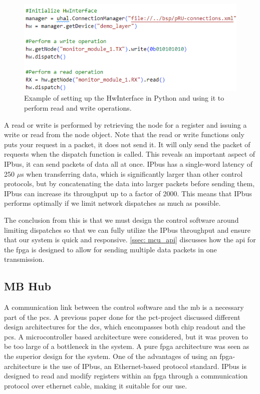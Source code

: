 \documentclass[main.tex]{subfiles}
\begin{document}
\begin{figure}[!htpb]
    \centering
    \includegraphics[scale=0.8]{images/HwInterface_example.png}
    \caption{Example of setting up the HwInterface in Python and using it to perform read and write operations.}
    \label{fig: hw_example}
\end{figure}
\FloatBarrier

A read or write is performed by retrieving the node for a register and issuing a write or read from the node object. Note that the read or write functions only puts your request in a packet, it does not send it. It will only send the packet of requests when the dispatch function is called. This reveals an important aspect of IPbus, it can send packets of data all at once. IPbus has a single-word latency of 250 $\mu$s when transferring data, which is significantly larger than other control protocols, but by concatenating the data into larger packets before sending them, IPbus can increase its throughput up to a factor of 2000\cite{IPbus}. This means that IPbus performs optimally if we limit network dispatches as much as possible.

The conclusion from this is that we must design the control software around limiting dispatches so that we can fully utilize the IPbus throughput and ensure that our system is quick and responsive. \autoref{ssec: mcu_api} discusses how the \gls{api} for the \gls{fpga} is designed to allow for sending multiple data packets in one transmission.


\subsection{MB Hub}
\label{section: fpga_design}
A communication link between the control software and the \gls{mb} is a necessary part of the \gls{pcs}. A previous paper done for the \gls{pct}-project discussed different design architectures for the \gls{dcs}, which encompasses both chip readout and the \gls{pcs}\cite{ola}. A microcontroller based architecture were considered, but it was proven to be too large of a bottleneck in the system. A pure \gls{fpga} architecture was seen as the superior design for the system. One of the advantages of using an \gls{fpga}-architecture is the use of IPbus, an Ethernet-based protocol standard. IPbus is designed to read and modify registers within an \gls{fpga} through a communication protocol over ethernet cable, making it suitable for our use.
\end{document}
